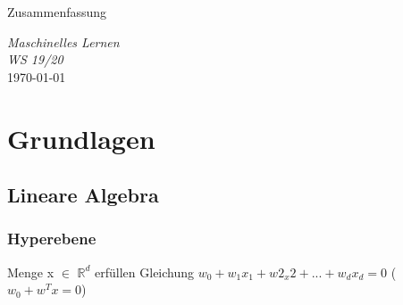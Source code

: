 \documentclass{report}
\begin{document}
\begin{center}
    \large Zusammenfassung
\end{center}

\begin{center}
    \Large \textit{Maschinelles Lernen}\\
    \vspace*{.5em}
    \normalsize \textit{WS 19/20}\\
    \vspace*{45em}
    \large \today
\end{center}

\newpage

\chapter{Grundlagen}
\vspace*{-1.25em}
\section{Lineare Algebra}
\subsection{Hyperebene}
Menge x $\in$ $\mathbb{R}^d$ erfüllen Gleichung $w_0 + w_1x_1 + w2_x2 + ... + w_dx_d = 0$ ($w_0 + w^Tx = 0$)
\end{document}
